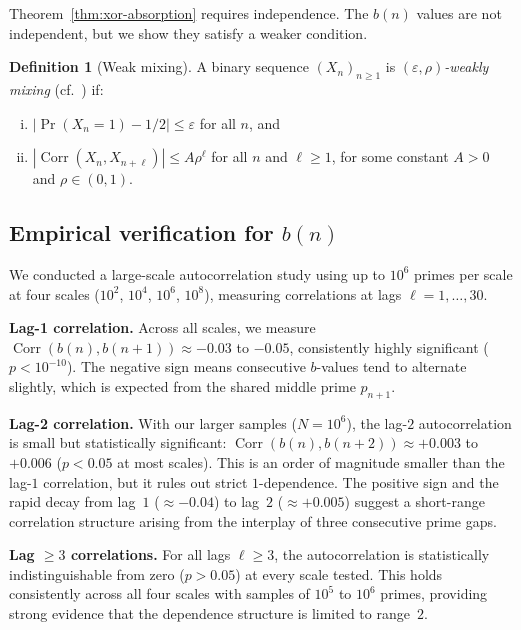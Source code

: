 \documentclass[11pt, a4paper]{amsart}
\theoremstyle{plain}
\theoremstyle{definition}
\newtheorem{definition}[theorem]{Definition}
\renewcommand{\Pr}{\operatorname{Pr}}
\newcommand{\Corr}{\operatorname{Corr}}
\begin{document}
Theorem~\ref{thm:xor-absorption} requires independence. The $b(n)$ values are not independent, but we show they satisfy a weaker condition.

\begin{definition}[Weak mixing]\label{def:mixing}
A binary sequence $(X_n)_{n \ge 1}$ is \emph{$(\varepsilon, \rho)$-weakly mixing} (cf.~\cite{Bradley2005}) if:
\begin{enumerate}[(i)]
\item $|\Pr(X_n = 1) - 1/2| \le \varepsilon$ for all $n$, and
\item $|\Corr(X_n, X_{n+\ell})| \le A \rho^{\ell}$ for all $n$ and $\ell \ge 1$, for some constant $A > 0$ and $\rho \in (0, 1)$.
\end{enumerate}
\end{definition}

\subsection{Empirical verification for $b(n)$}

We conducted a large-scale autocorrelation study using up to $10^6$ primes per scale at four scales
($10^2$, $10^4$, $10^6$, $10^8$), measuring correlations at lags $\ell = 1, \ldots, 30$.

\textbf{Lag-1 correlation.} Across all scales, we measure $\Corr(b(n), b(n+1)) \approx -0.03$ to $-0.05$, consistently
highly significant ($p < 10^{-10}$). The negative sign means consecutive $b$-values tend to alternate slightly,
which is expected from the shared middle prime $p_{n+1}$.

\textbf{Lag-2 correlation.} With our larger samples ($N = 10^6$), the lag-$2$ autocorrelation is small but
statistically significant: $\Corr(b(n), b(n+2)) \approx +0.003$ to $+0.006$ ($p < 0.05$ at most scales).
This is an order of magnitude smaller than the lag-$1$ correlation, but it rules out strict $1$-dependence.
The positive sign and the rapid decay from lag~$1$ ($\approx -0.04$) to lag~$2$ ($\approx +0.005$) suggest
a short-range correlation structure arising from the interplay of three consecutive prime gaps.

\textbf{Lag $\ge 3$ correlations.} For all lags $\ell \ge 3$, the autocorrelation is statistically indistinguishable
from zero ($p > 0.05$) at every scale tested. This holds consistently across all four scales with samples
of $10^5$ to $10^6$ primes, providing strong evidence that the dependence structure is limited to range~$2$.
\end{document}
